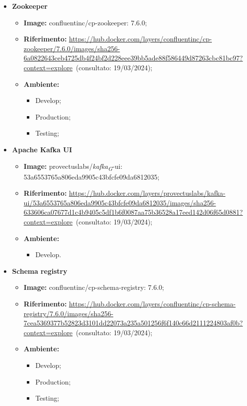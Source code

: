 \begin{itemize}
  \item \textbf{Zookeeper} 
    \begin{itemize}
      \item \textbf{Image:} confluentinc/cp-zookeeper: 7.6.0;
      \item \textbf{Riferimento:} \url{https://hub.docker.com/layers/confluentinc/cp-zookeeper/7.6.0/images/sha256-6a0822643ceb4725db4f24bf2d228eee39bb5ade88f586449d87263cbc81bc97?context=explore}~(consultato: 19/03/2024);
      \item \textbf{Ambiente:}
        \begin{itemize}
          \item Develop;
          \item Production;
          \item Testing;
        \end{itemize}
    \end{itemize}

  \item \textbf{Apache Kafka UI} 
    \begin{itemize}
      \item \textbf{Image:} provectuslabs/\textit{kafka}\textsubscript{\textit{G}}-ui: 53a6553765a806eda9905c43bfcfe09da6812035;
      \item \textbf{Riferimento:} \url{https://hub.docker.com/layers/provectuslabs/kafka-ui/53a6553765a806eda9905c43bfcfe09da6812035/images/sha256-633606ca07677d1c4b9405c5df1b6f0087aa75b36528a17eed142d06f65d0881?context=explore}~(consultato: 19/03/2024);
      \item \textbf{Ambiente:}
        \begin{itemize}
          \item Develop.
        \end{itemize}
    \end{itemize}

  \item \textbf{Schema registry} 
    \begin{itemize}
      \item \textbf{Image:} confluentinc/cp-schema-registry: 7.6.0;
      \item \textbf{Riferimento:} \url{https://hub.docker.com/layers/confluentinc/cp-schema-registry/7.6.0/images/sha256-7cea5369377b52823d3101dd22073a235a501256f6f140c66d2111224803af0b?context=explore}~(consultato: 19/03/2024);
      \item \textbf{Ambiente:}
        \begin{itemize}
          \item Develop;
          \item Production;
          \item Testing;
        \end{itemize}
    \end{itemize}


\end{itemize}
